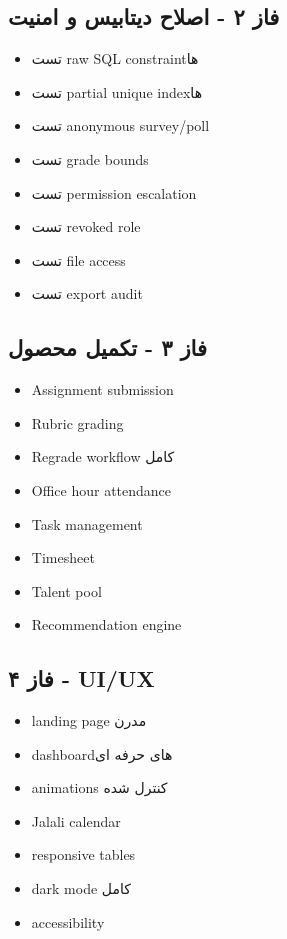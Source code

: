 \documentclass[11pt,a4paper]{article}
\begin{document}
\subsection{فاز ۲ - اصلاح دیتابیس و امنیت}
\begin{itemize}
\item تست raw SQL constraintها
\item تست partial unique indexها
\item تست anonymous survey/poll
\item تست grade bounds
\item تست permission escalation
\item تست revoked role
\item تست file access
\item تست export audit
\end{itemize}
\subsection{فاز ۳ - تکمیل محصول}
\begin{itemize}
\item Assignment submission
\item Rubric grading
\item Regrade workflow کامل
\item Office hour attendance
\item Task management
\item Timesheet
\item Talent pool
\item Recommendation engine
\end{itemize}
\subsection{فاز ۴ - UI/UX}
\begin{itemize}
\item landing page مدرن
\item dashboardهای حرفه ای
\item animations کنترل شده
\item Jalali calendar
\item responsive tables
\item dark mode کامل
\item accessibility
\end{itemize}
\end{document}
